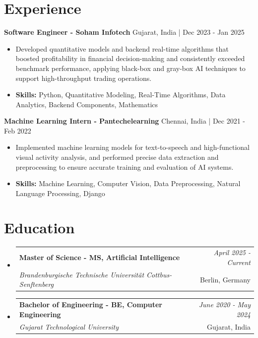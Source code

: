 \documentclass[a4paper,11pt]{article}
\makeatletter
\newcommand{\resumeSubheading}[4]{
\vspace{0.5mm}\item
    \begin{tabular*}{\linewidth}[t]{l@{\extracolsep{\fill}}r}
        \textbf{#1} & \textit{\footnotesize{#4}} \\
        \textit{\footnotesize{#3}} &  \footnotesize{#2}\\
    \end{tabular*}
    \vspace{-2.4mm}
}
\makeatother
\begin{document}
\section{\textbf{Experience}}


\vspace{1mm}
  \textbf{Software Engineer - Soham Infotech} \hfill Gujarat, India | Dec 2023 - Jan 2025
\vspace{-1.5mm} %
\begin{itemize}
  \item Developed quantitative models and backend real-time algorithms that boosted profitability in financial decision-making and consistently exceeded benchmark performance, applying black-box and gray-box AI techniques to support high-throughput trading operations.

\vspace{-2mm}
  \item \textbf{Skills:} Python, Quantitative Modeling, Real-Time Algorithms, Data Analytics, Backend Components, Mathematics
\end{itemize}

\vspace{1mm}
  \textbf{Machine Learning Intern - Pantechelearning} \hfill Chennai, India | Dec 2021 - Feb 2022
\vspace{-1.5mm} %
\begin{itemize}
  \item Implemented machine learning models for text-to-speech and high-functional visual activity analysis, and performed precise data extraction and preprocessing to ensure accurate training and evaluation of AI systems.
\vspace{-2mm}
  \item \textbf{Skills:} Machine Learning, Computer Vision, Data Preprocessing, Natural Language Processing, Django
\end{itemize}\section{\textbf{Education}}
\vspace{-0.4mm}

\begin{itemize}[leftmargin=0.15in, label={}]
\resumeSubheading
{Master of Science - MS, Artificial Intelligence }{Berlin, Germany}
{Brandenburgische Technische Universität Cottbus-Senftenberg  }{April 2025 - Current}

\vspace{1.0mm} %
\resumeSubheading
{Bachelor of Engineering - BE, Computer Engineering  }{Gujarat, India}
{Gujarat Technological University }{June 2020 - May 2024}

\end{itemize}
\end{document}
